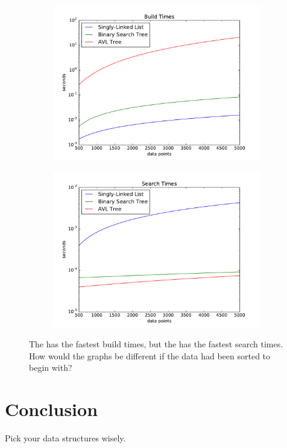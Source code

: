 \begin{problem}
\begin{figure}[H]
    \centering
    \begin{subfigure}[b]{.5\textwidth}
        \centering
        \includegraphics[width=\textwidth]{BuildTimes.pdf}
    \end{subfigure}%
    \begin{subfigure}[b]{.5\textwidth}
        \centering
        \includegraphics[width=\textwidth]{SearchTimes.pdf}
    \end{subfigure}
    \caption{The  has the fastest build times, but the  has the fastest search times. How would the graphs be different if the data had been sorted to begin with?}
    \label{fig:times}
\end{figure}

\end{problem}

\section*{Conclusion}

Pick your data structures wisely.
